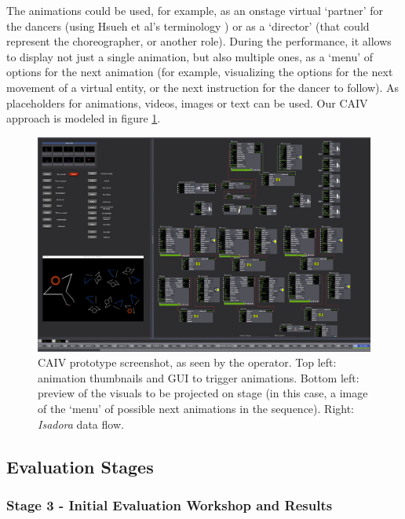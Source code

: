 The animations could be used, for example, as an onstage virtual ‘partner’ for the dancers (using Hsueh et al’s terminology \cite{hsueh_understanding_2019}) or as a ‘director’ (that could represent the choreographer, or another role). During the performance, it allows to display not just a single animation, but also multiple ones, as a ‘menu’ of options for the next animation (for example, visualizing the options for the next movement of a virtual entity, or the next instruction for the dancer to follow). As placeholders for animations, videos, images or text can be used. Our CAIV approach is modeled in figure \ref{fig:hitl-screenshot}.

\begin{figure}[ht]
  \centering
  \includegraphics[width=0.65\linewidth]{Chapters/Figures/modi_dis/hitl-screenshot-s.jpg}
  \caption{CAIV prototype screenshot, as seen by the operator. Top left: animation thumbnails and GUI to trigger animations. Bottom left: preview of the visuals to be projected on stage (in this case, a image of the ‘menu’ of possible next animations in the sequence). Right: \textit{Isadora} data flow.}
    \label{fig:hitl-screenshot}
\end{figure}


\subsection{Evaluation Stages}

\subsubsection{Stage 3 - Initial Evaluation Workshop and Results}

